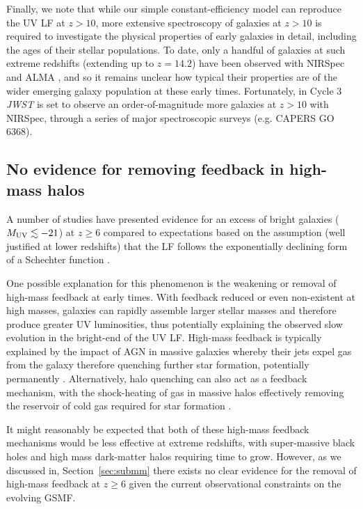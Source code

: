 \documentclass[fleqn,usenatbib]{mnras}
\begin{document}
Finally, we note that while our simple constant-efficiency model can reproduce the UV LF at $z>10$, more extensive spectroscopy of galaxies at $z >10$ is required to investigate the physical properties of early galaxies in detail, including the ages of their stellar populations. To date, only a handful of galaxies at such extreme redshifts (extending up to $z = 14.2$) have been observed with NIRSpec \citep[e.g.][]{bunker2023,arrabalharo2023,castellano2024} and ALMA \citep{schouws2024,zavala2024}, and so it remains unclear how typical their properties are of the wider emerging galaxy population at these early times. Fortunately, in Cycle 3 \textit{JWST} is set to observe an order-of-magnitude more galaxies at $z>10$ with NIRSpec, through a series of major spectroscopic surveys (e.g. CAPERS GO 6368). 

\subsection{No evidence for removing feedback in high-mass halos}
A number of studies have presented evidence for an excess of bright galaxies ($M_{\rm UV}\lesssim-21$) at $z\geq6$ compared to expectations based on the assumption (well justified at lower redshifts) that the LF follows the exponentially declining form of a Schechter function \citep[e.g.][]{bowler2014,bowler2020,stefanon2019}. 

One possible explanation for this phenomenon is the weakening or removal of high-mass feedback at early times. With feedback reduced or even non-existent at high masses, galaxies can rapidly assemble larger stellar masses and therefore produce greater UV luminosities, thus potentially explaining the observed slow evolution in the bright-end of the UV LF. High-mass feedback is typically explained by the impact of AGN in massive galaxies whereby their jets expel gas from the galaxy therefore quenching further star formation, potentially permanently  \citep{hopkins2006}. Alternatively, halo quenching can also act as a feedback mechanism, with the shock-heating of gas in massive halos effectively removing the reservoir of cold gas required for star formation \citep[][]{somerville2008,gabor2015}.

It might reasonably be expected that both of these high-mass feedback mechanisms would be less effective at extreme redshifts, with super-massive black holes and high mass dark-matter halos requiring time to grow.
However, as we discussed in, Section~\ref{sec:submm} there exists no clear evidence for the removal of high-mass feedback at $z\geq6$ given the current observational constraints on the evolving GSMF.
\end{document}
